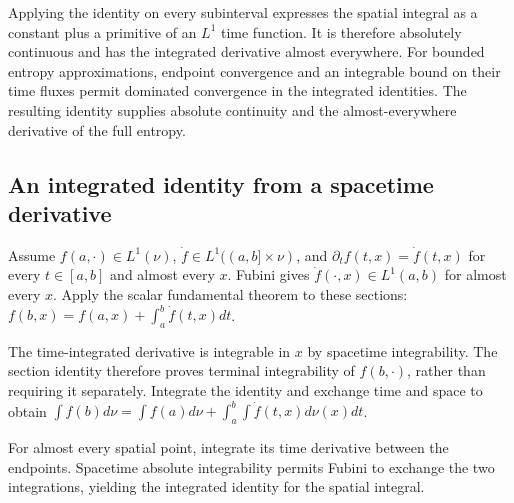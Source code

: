 \documentclass[11pt,a4paper]{report}
\begin{document}
Applying the identity on every subinterval expresses the spatial integral as a constant plus a primitive of an \(L^1\) time function. It is therefore absolutely continuous and has the integrated derivative almost everywhere. For bounded entropy approximations, endpoint convergence and an integrable bound on their time fluxes permit dominated convergence in the integrated identities. The resulting identity supplies absolute continuity and the almost-everywhere derivative of the full entropy.

\subsection{\texorpdfstring{An integrated identity from a spacetime derivative}{An integrated identity from a spacetime derivative}}
\label{report-step-UnadjustedLangevin-LSI-EntropyChainRule-lean-1}


Assume \(f(a,\cdot)\in L^1(\nu)\), \(\dot f\in L^1((a,b]\times\nu)\), and \(\partial_t f(t,x)=\dot f(t,x)\) for every \(t\in[a,b]\) and almost every \(x\). Fubini gives \(\dot f(\cdot,x)\in L^1(a,b)\) for almost every \(x\). Apply the scalar fundamental theorem to these sections: \(f(b,x)=f(a,x)+\int_a^b\dot f(t,x)dt\).



The time-integrated derivative is integrable in \(x\) by spacetime integrability. The section identity therefore proves terminal integrability of \(f(b,\cdot)\), rather than requiring it separately. Integrate the identity and exchange time and space to obtain \(\int f(b)d\nu=\int f(a)d\nu+\int_a^b\int\dot f(t,x)d\nu(x)dt\).



For almost every spatial point, integrate its time derivative between the endpoints. Spacetime absolute integrability permits Fubini to exchange the two integrations, yielding the integrated identity for the spatial integral.
\end{document}
